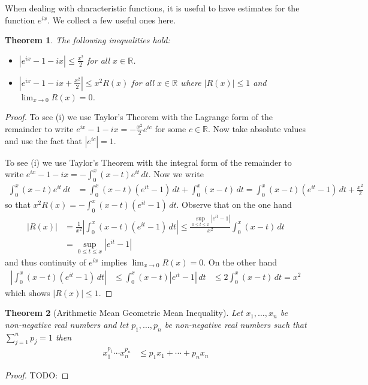 \documentclass{amsbook}
\newtheorem{thm}{Theorem}[chapter]
\theoremstyle{definition}
\theoremstyle{remark}
\newcommand{\reals}{\mathbb{R}}
\newcommand{\abs}[1]{\left \vert #1 \right \vert}
\begin{document}
When dealing with characteristic functions, it is useful to have
estimates for the function $e^{ix}$.  We collect a few useful ones
here.
\begin{thm}\label{BasicComplexExponentialInequalities}The following
  inequalities hold:
\begin{itemize}
\item[(i)] $\abs{e^{ix} -1 - ix} \leq \frac{x^2}{2}$ for all $x \in \reals$.
\item[(ii)] $\abs{e^{ix} -1 - ix + \frac{x^2}{2}} \leq x^2 R(x)$ for
  all $x \in \reals$ where $\abs{R(x)} \leq 1$ and $\lim_{x \to 0}
  R(x) = 0$.
\end{itemize}
\end{thm}
\begin{proof}
To see (i) we use Taylor's Theorem with the Lagrange form of the
remainder to write $e^{ix} - 1 - ix = -\frac{x^2}{2} e^{ic}$ for some
$c \in \reals$.  Now take absolute values and use the fact that
$\abs{e^{ic}}=1$.

To see (i) we use Taylor's Theorem with the integral form of the
remainder to write $e^{ix} - 1 - ix = - \int_0^x (x - t) e^{it} \,
dt$.  Now we write 
\begin{align*}
 \int_0^x (x - t) e^{it} \, dt &=  \int_0^x (x - t) (e^{it} - 1) \, dt
+ \int_0^x (x-t) \, dt 
= \int_0^x (x - t) (e^{it} - 1) \, dt + \frac{x^2}{2}
\end{align*}
so that $x^2 R(x) = -\int_0^x (x - t) (e^{it} - 1) \, dt$.  Observe that on the one hand
\begin{align*}
\abs{R(x)}
&=\frac{1}{x^2} \abs{\int_0^x (x - t) (e^{it} - 1) \, dt} 
\leq \frac{\sup_{0 \leq t \leq x} \abs{e^{it} - 1}}{x^2} \int_0^x (x - t) \, dt \\
&=\sup_{0 \leq t \leq x} \abs{e^{it} - 1}
\end{align*}
and thus continuity of $e^{ix}$ implies $\lim_{x \to 0} R(x) = 0$.
On the other hand
\begin{align*}
\abs{\int_0^x (x - t) (e^{it} - 1) \, dt} 
&\leq \int_0^x (x - t) \abs{e^{it} - 1} \, dt
&\leq 2 \int_0^x (x - t) \, dt = x^2
\end{align*}
which shows $\abs{R(x)} \leq 1$.  
\end{proof}

\begin{thm}[Arithmetic Mean Geometric Mean Inequality]\label{AMGM}Let $x_1, \dotsc, x_n$ be non-negative real
  numbers and let $p_1, \dotsc, p_n$ be non-negative real numbers such
  that $\sum_{j=1}^n p_j = 1$ then
\begin{align*}
x_1^{p_1} \dotsm x_n^{p_n} &\leq p_1 x_1 + \dotsm + p_n x_n
\end{align*}
\end{thm}
\begin{proof}
TODO:
\end{proof}
\end{document}
